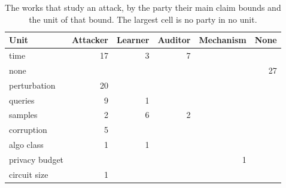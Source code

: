 \begin{table}[t]
\centering
\small
\caption{The \NumAttackWorks{} works that study an attack, by the party their main claim bounds and the unit of that bound. The largest cell is no party in no unit.}
\label{tab:attack-party-unit}
\begin{tabular}{@{}lrrrrr@{}}
\toprule
Unit & Attacker & Learner & Auditor & Mechanism & None \\
\midrule
time & 17 & 3 & 7 &  &  \\
none &  &  &  &  & 27 \\
perturbation & 20 &  &  &  &  \\
queries & 9 & 1 &  &  &  \\
samples & 2 & 6 & 2 &  &  \\
corruption & 5 &  &  &  &  \\
algo class & 1 & 1 &  &  &  \\
privacy budget &  &  &  & 1 &  \\
circuit size & 1 &  &  &  &  \\
\bottomrule
\end{tabular}
\end{table}
